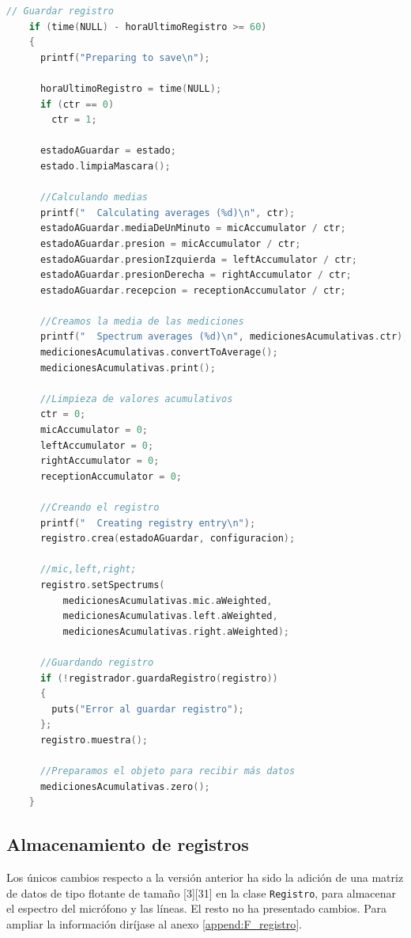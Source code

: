 \begin{lstlisting}[language=c++, label={lst:lms9-registrador}, caption={Generación de registros en el LM9.}]
	// Guardar registro
    if (time(NULL) - horaUltimoRegistro >= 60)
    {
      printf("Preparing to save\n");

      horaUltimoRegistro = time(NULL);
      if (ctr == 0)
        ctr = 1;

      estadoAGuardar = estado;
      estado.limpiaMascara();

      //Calculando medias
      printf("  Calculating averages (%d)\n", ctr);
      estadoAGuardar.mediaDeUnMinuto = micAccumulator / ctr;
      estadoAGuardar.presion = micAccumulator / ctr;
      estadoAGuardar.presionIzquierda = leftAccumulator / ctr;
      estadoAGuardar.presionDerecha = rightAccumulator / ctr;
      estadoAGuardar.recepcion = receptionAccumulator / ctr;

      //Creamos la media de las mediciones
      printf("  Spectrum averages (%d)\n", medicionesAcumulativas.ctr);
      medicionesAcumulativas.convertToAverage();
      medicionesAcumulativas.print();

      //Limpieza de valores acumulativos
      ctr = 0;
      micAccumulator = 0;
      leftAccumulator = 0;
      rightAccumulator = 0;
      receptionAccumulator = 0;

      //Creando el registro
      printf("  Creating registry entry\n");
      registro.crea(estadoAGuardar, configuracion);

      //mic,left,right;
      registro.setSpectrums(
          medicionesAcumulativas.mic.aWeighted,
          medicionesAcumulativas.left.aWeighted,
          medicionesAcumulativas.right.aWeighted);

      //Guardando registro
      if (!registrador.guardaRegistro(registro))
      {
        puts("Error al guardar registro");
      };
      registro.muestra();

      //Preparamos el objeto para recibir más datos
      medicionesAcumulativas.zero();
    }
\end{lstlisting}


\subsection{Almacenamiento de registros}

Los únicos cambios respecto a la versión anterior ha sido la adición de una matriz de datos de tipo flotante de tamaño [3][31] en la clase \verb|Registro|, para almacenar el espectro del micrófono y las líneas. El resto no ha presentado cambios. Para ampliar la información diríjase al anexo \ref{append:F_registro}.

